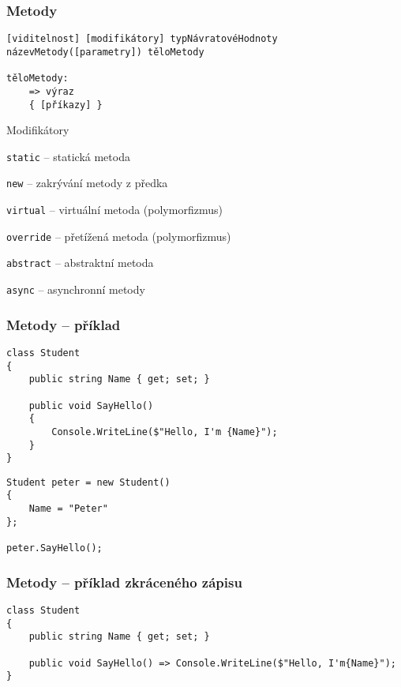 \begin{frame}[fragile]
\frametitle{Metody}
\vfill
\begin{noteblock}{}
\begin{lstlisting}
[viditelnost] [modifikátory] typNávratovéHodnoty názevMetody([parametry]) těloMetody

těloMetody:
	=> výraz
	{ [příkazy] }
\end{lstlisting}
\end{noteblock}
\vfill
\begin{bitemize}{Modifikátory}
\item \lstinline|static| -- statická metoda
\item \lstinline|new| -- zakrývání metody z předka
\item \lstinline|virtual| -- virtuální metoda (polymorfizmus)
\item \lstinline|override| -- přetížená metoda (polymorfizmus)
\item \lstinline|abstract| -- abstraktní metoda
\item \lstinline|async| -- asynchronní metody
\end{bitemize}
\vfill
\end{frame}



\begin{frame}[fragile]
\frametitle{Metody -- příklad}
\vfill
\begin{yesblock}
\begin{lstlisting}[basicstyle=\small]
class Student
{
    public string Name { get; set; }

    public void SayHello()
    {
        Console.WriteLine($"Hello, I'm {Name}");
    }
}
\end{lstlisting}
\end{yesblock}
\vfill
\begin{yesblock}
\begin{lstlisting}[basicstyle=\small]
Student peter = new Student()
{
    Name = "Peter"
};

peter.SayHello();
\end{lstlisting}
\end{yesblock}
\vfill
\end{frame}




\begin{frame}[fragile]
\frametitle{Metody -- příklad zkráceného zápisu}
\vfill
\begin{yesblock}
\begin{lstlisting}[basicstyle=\small]
class Student
{
    public string Name { get; set; }

    public void SayHello() => Console.WriteLine($"Hello, I'm{Name}");
}
\end{lstlisting}
\end{yesblock}
\vfill
\end{frame}





